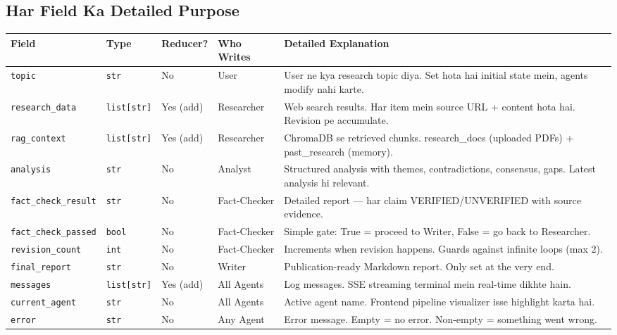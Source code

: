 \documentclass[11pt,a4paper,twoside]{report}
\begin{document}
\subsection{Har Field Ka Detailed Purpose}

\begin{longtable}{|p{3cm}|p{2cm}|p{1.5cm}|p{2cm}|p{4.5cm}|}
\hline
\textbf{Field} & \textbf{Type} & \textbf{Reducer?} & \textbf{Who Writes} & \textbf{Detailed Explanation} \\
\hline
\endhead
\texttt{topic} & \texttt{str} & No & User & User ne kya research topic diya. Set hota hai initial state mein, agents modify nahi karte. \\
\hline
\texttt{research\_data} & \texttt{list[str]} & Yes (add) & Researcher & Web search results. Har item mein source URL + content hota hai. Revision pe accumulate. \\
\hline
\texttt{rag\_context} & \texttt{list[str]} & Yes (add) & Researcher & ChromaDB se retrieved chunks. research\_docs (uploaded PDFs) + past\_research (memory). \\
\hline
\texttt{analysis} & \texttt{str} & No & Analyst & Structured analysis with themes, contradictions, consensus, gaps. Latest analysis hi relevant. \\
\hline
\texttt{fact\_check\_result} & \texttt{str} & No & Fact-Checker & Detailed report --- har claim VERIFIED/UNVERIFIED with source evidence. \\
\hline
\texttt{fact\_check\_passed} & \texttt{bool} & No & Fact-Checker & Simple gate: True = proceed to Writer, False = go back to Researcher. \\
\hline
\texttt{revision\_count} & \texttt{int} & No & Fact-Checker & Increments when revision happens. Guards against infinite loops (max 2). \\
\hline
\texttt{final\_report} & \texttt{str} & No & Writer & Publication-ready Markdown report. Only set at the very end. \\
\hline
\texttt{messages} & \texttt{list[str]} & Yes (add) & All Agents & Log messages. SSE streaming terminal mein real-time dikhte hain. \\
\hline
\texttt{current\_agent} & \texttt{str} & No & All Agents & Active agent name. Frontend pipeline visualizer isse highlight karta hai. \\
\hline
\texttt{error} & \texttt{str} & No & Any Agent & Error message. Empty = no error. Non-empty = something went wrong. \\
\hline
\end{longtable}
\end{document}
